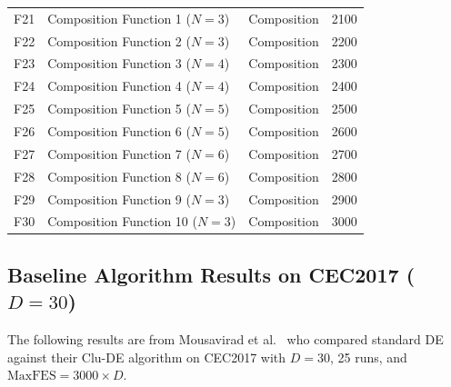 \documentclass[11pt]{article}
\begin{document}
\begin{table}[htbp]
\begin{tabular}{@{}clcc@{}}
F21 & Composition Function 1 ($N=3$) & Composition & 2100 \\
F22 & Composition Function 2 ($N=3$) & Composition & 2200 \\
F23 & Composition Function 3 ($N=4$) & Composition & 2300 \\
F24 & Composition Function 4 ($N=4$) & Composition & 2400 \\
F25 & Composition Function 5 ($N=5$) & Composition & 2500 \\
F26 & Composition Function 6 ($N=5$) & Composition & 2600 \\
F27 & Composition Function 7 ($N=6$) & Composition & 2700 \\
F28 & Composition Function 8 ($N=6$) & Composition & 2800 \\
F29 & Composition Function 9 ($N=3$) & Composition & 2900 \\
F30 & Composition Function 10 ($N=3$) & Composition & 3000 \\
\bottomrule
\end{tabular}
\end{table}

\subsection{Baseline Algorithm Results on CEC2017 ($D=30$)}

The following results are from Mousavirad et al.~\cite{mousavirad2021clude} who compared 
standard DE against their Clu-DE algorithm on CEC2017 with $D=30$, 25 runs, and 
$\text{MaxFES} = 3000 \times D$.
\end{document}
